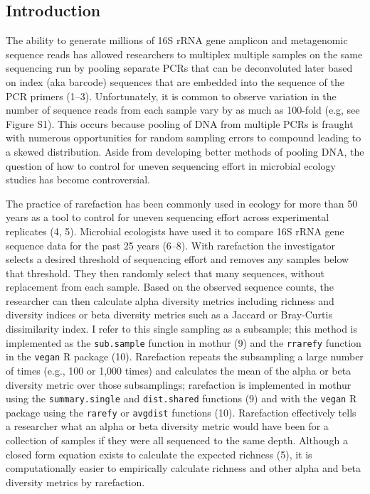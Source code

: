 \documentclass[
]{article}
\begin{document}
\newpage

\hypertarget{introduction}{%
\subsection{Introduction}\label{introduction}}

The ability to generate millions of 16S rRNA gene amplicon and
metagenomic sequence reads has allowed researchers to multiplex multiple
samples on the same sequencing run by pooling separate PCRs that can be
deconvoluted later based on index (aka barcode) sequences that are
embedded into the sequence of the PCR primers (1--3). Unfortunately, it
is common to observe variation in the number of sequence reads from each
sample vary by as much as 100-fold (e.g, see Figure S1). This occurs
because pooling of DNA from multiple PCRs is fraught with numerous
opportunities for random sampling errors to compound leading to a skewed
distribution. Aside from developing better methods of pooling DNA, the
question of how to control for uneven sequencing effort in microbial
ecology studies has become controversial.

The practice of rarefaction has been commonly used in ecology for more
than 50 years as a tool to control for uneven sequencing effort across
experimental replicates (4, 5). Microbial ecologists have used it to
compare 16S rRNA gene sequence data for the past 25 years (6--8). With
rarefaction the investigator selects a desired threshold of sequencing
effort and removes any samples below that threshold. They then randomly
select that many sequences, without replacement from each sample. Based
on the observed sequence counts, the researcher can then calculate alpha
diversity metrics including richness and diversity indices or beta
diversity metrics such as a Jaccard or Bray-Curtis dissimilarity index.
I refer to this single sampling as a subsample; this method is
implemented as the \texttt{sub.sample} function in mothur (9) and the
\texttt{rrarefy} function in the \texttt{vegan} R package (10).
Rarefaction repeats the subsampling a large number of times (e.g., 100
or 1,000 times) and calculates the mean of the alpha or beta diversity
metric over those subsamplings; rarefaction is implemented in mothur
using the \texttt{summary.single} and \texttt{dist.shared} functions (9)
and with the \texttt{vegan} R package using the \texttt{rarefy} or
\texttt{avgdist} functions (10). Rarefaction effectively tells a
researcher what an alpha or beta diversity metric would have been for a
collection of samples if they were all sequenced to the same depth.
Although a closed form equation exists to calculate the expected
richness (5), it is computationally easier to empirically calculate
richness and other alpha and beta diversity metrics by rarefaction.
\end{document}
